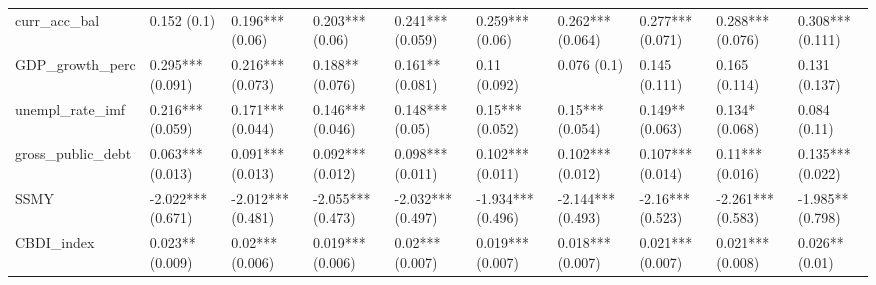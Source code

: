 \begin{table}[ht]
\begin{tabular}{llllllllll}
  curr\_acc\_bal & 0.152 (0.1) & 0.196*** (0.06) & 0.203*** (0.06) & 0.241*** (0.059) & 0.259*** (0.06) & 0.262*** (0.064) & 0.277*** (0.071) & 0.288*** (0.076) & 0.308*** (0.111) \\ 
  GDP\_growth\_perc & 0.295*** (0.091) & 0.216*** (0.073) & 0.188** (0.076) & 0.161** (0.081) & 0.11 (0.092) & 0.076 (0.1) & 0.145 (0.111) & 0.165 (0.114) & 0.131 (0.137) \\ 
  unempl\_rate\_imf & 0.216*** (0.059) & 0.171*** (0.044) & 0.146*** (0.046) & 0.148*** (0.05) & 0.15*** (0.052) & 0.15*** (0.054) & 0.149** (0.063) & 0.134* (0.068) & 0.084 (0.11) \\ 
  gross\_public\_debt & 0.063*** (0.013) & 0.091*** (0.013) & 0.092*** (0.012) & 0.098*** (0.011) & 0.102*** (0.011) & 0.102*** (0.012) & 0.107*** (0.014) & 0.11*** (0.016) & 0.135*** (0.022) \\ 
  SSMY & -2.022*** (0.671) & -2.012*** (0.481) & -2.055*** (0.473) & -2.032*** (0.497) & -1.934*** (0.496) & -2.144*** (0.493) & -2.16*** (0.523) & -2.261*** (0.583) & -1.985** (0.798) \\ 
  CBDI\_index & 0.023** (0.009) & 0.02*** (0.006) & 0.019*** (0.006) & 0.02*** (0.007) & 0.019*** (0.007) & 0.018*** (0.007) & 0.021*** (0.007) & 0.021*** (0.008) & 0.026** (0.01) \\ 
   \bottomrule
\end{tabular}
\endgroup
\end{table}
